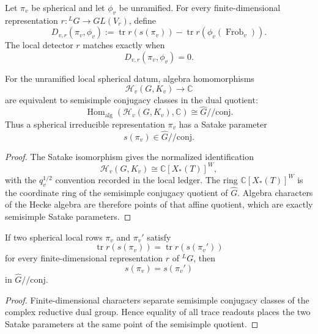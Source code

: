 \begin{definition}
\label{def:unified-reality-local-hecke-frobenius-residual}
Let $\pi_v$ be spherical and let $\phi_v$ be unramified. For every
finite-dimensional representation $r:{}^LG\to GL(V_r)$, define
$$
D_{v,r}(\pi_v,\phi_v)
:=
\operatorname{tr}r(s(\pi_v))
-
\operatorname{tr}r(\phi_v(\operatorname{Frob}_v)).
$$
The local detector $r$ matches exactly when
$$
D_{v,r}(\pi_v,\phi_v)=0.
$$
\end{definition}

\begin{theorem}
\label{thm:unified-reality-unramified-satake-correspondence}
For the unramified local spherical datum, algebra homomorphisms
$$
\mathcal H_v(G,K_v)\to\mathbb C
$$
are equivalent to semisimple conjugacy classes in the dual quotient:
$$
\operatorname{Hom}_{\mathrm{alg}}(\mathcal H_v(G,K_v),\mathbb C)
\cong
\widehat G/\!/\mathrm{conj}.
$$
Thus a spherical irreducible representation $\pi_v$ has a Satake
parameter
$$
s(\pi_v)\in\widehat G/\!/\mathrm{conj}.
$$
\end{theorem}
\begin{proof}
The Satake isomorphism gives the normalized identification
$$
\mathcal H_v(G,K_v)
\cong
\mathbb C[X_\ast(T)]^W,
$$
with the $q_v^{1/2}$ convention recorded in the local ledger. The ring
$\mathbb C[X_\ast(T)]^W$ is the coordinate ring of the semisimple
conjugacy quotient of $\widehat G$. Algebra characters of the Hecke
algebra are therefore points of that affine quotient, which are exactly
semisimple Satake parameters.
\end{proof}

\begin{corollary}
\label{cor:unified-reality-local-detectors-separate-satake}
If two spherical local rows $\pi_v$ and $\pi_v'$ satisfy
$$
\operatorname{tr}r(s(\pi_v))
=
\operatorname{tr}r(s(\pi_v'))
$$
for every finite-dimensional representation $r$ of ${}^LG$, then
$$
s(\pi_v)=s(\pi_v')
$$
in $\widehat G/\!/\mathrm{conj}$.
\end{corollary}
\begin{proof}
Finite-dimensional characters separate semisimple conjugacy classes of
the complex reductive dual group. Hence equality of all trace readouts
places the two Satake parameters at the same point of the semisimple
quotient.
\end{proof}

